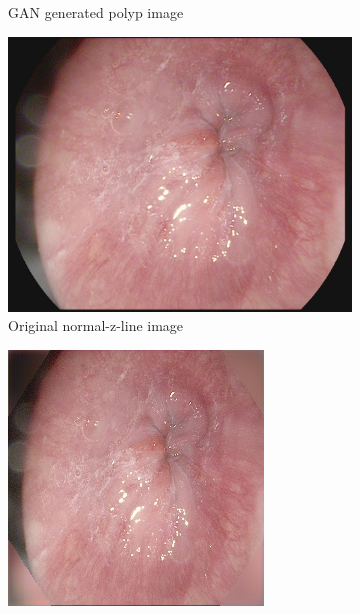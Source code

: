 \begin{figure}
\begin{subfigure}[t]{\myfigsizethree}
            \caption{GAN generated polyp image}    
            \label{fig:polyp_GAN_CORNER1}
        \end{subfigure}
        \qquad\vfill
       	\begin{subfigure}[t]{\myfigsizethree}   
            \centering 
            \includegraphics[height=\textwidth,width=\textwidth]{experiments/figures/blackcorner/zORIG.jpg}
            \caption{Original normal-z-line image }   
            \label{fig:z_ORIG_CORNER1}
        \end{subfigure}
        \qquad
        \begin{subfigure}[t]{\myfigsizethree}   
            \centering 
            \includegraphics[width=\textwidth]{experiments/figures/blackcorner/zAE.jpg}

\end{subfigure}
\end{figure}
